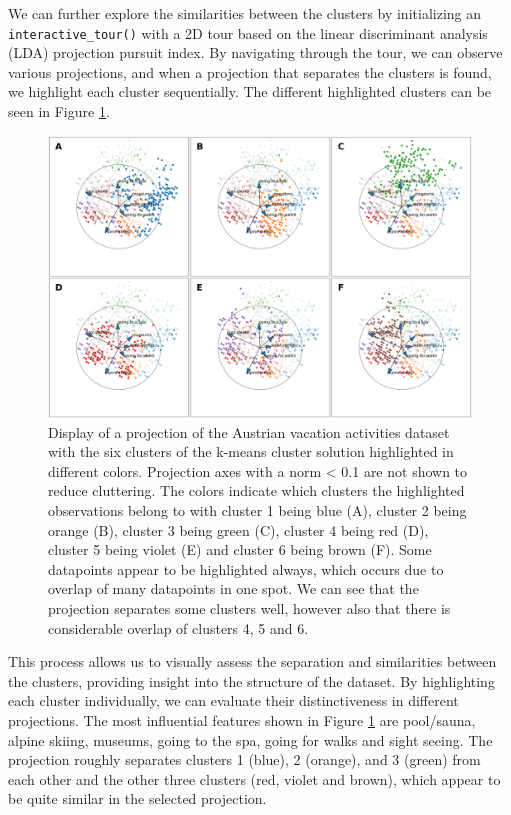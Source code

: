 \documentclass[article]{ajs}
\begin{document}
We can further explore the similarities between the clusters by initializing an \texttt{interactive\_tour()} with a 2D tour based on the linear discriminant analysis (LDA) projection pursuit index. By navigating through the tour, we can observe various projections, and when a projection that separates the clusters is found, we highlight each cluster sequentially. The different highlighted clusters can be seen in Figure \ref{fig:winter_activ_cluster_highlights}.

\begin{figure}[h!]
    \centering
    \includegraphics[width=1\textwidth]{winter_activ_cluster_highlights.png}
    \caption{Display of a projection of the Austrian vacation activities dataset with the six clusters of the k-means cluster solution highlighted in different colors. Projection axes with a norm < 0.1 are not shown to reduce cluttering. The colors indicate which clusters the highlighted observations belong to with cluster 1 being blue (A), cluster 2 being orange (B), cluster 3 being green (C), cluster 4 being red (D), cluster 5 being violet (E) and cluster 6 being brown (F). Some datapoints appear to be highlighted always, which occurs due to overlap of many datapoints in one spot. We can see that the projection separates some clusters well, however also that there is considerable overlap of clusters 4, 5 and 6.}
    \label{fig:winter_activ_cluster_highlights}
\end{figure}

This process allows us to visually assess the separation and similarities between the clusters, providing insight into the structure of the dataset. By highlighting each cluster individually, we can evaluate their distinctiveness in different projections. The most influential features shown in Figure \ref{fig:winter_activ_cluster_highlights} are pool/sauna, alpine skiing, museums, going to the spa, going for walks and sight seeing. The projection roughly separates clusters 1 (blue), 2 (orange), and 3 (green) from each other and the other three clusters (red, violet and brown), which appear to be quite similar in the selected projection. 
\end{document}
